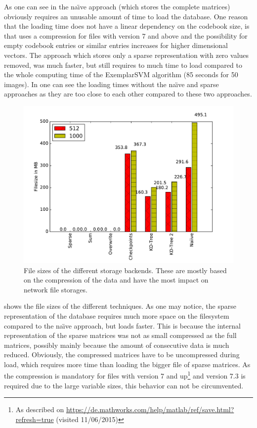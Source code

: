 As one can see in  the na\"{\i}ve approach (which stores the complete matrices) obviously requires an unusable amount of time to load the database. One reason that the loading time does not have a linear dependency on the codebook size, is that \MATLAB uses a compression for files with version 7 and above and the possibility for empty codebook entries or similar entries increases for higher dimensional vectors. The approach which stores only a sparse representation with zero values removed, was much faster, but still requires to much time to load compared to the whole computing time of the ExemplarSVM algorithm (85 seconds for 50 images). In  one can see the loading times without the na\"{\i}ve and sparse approaches as they are too close to each other compared to these two approaches.


\begin{figure}
\centering
\includegraphics[width=0.7\linewidth]{images/file_size}
\caption[File sizes of the different storage backends]{File sizes of the different storage backends. These are mostly based on the compression of the data and have the most impact on network file storages.}
\label{fig:file_sizes}
\end{figure}

 shows the file sizes of the different techniques. As one may notice, the \MATLAB sparse representation of the database requires much more space on the filesystem compared to the na\"{\i}ve approach, but loads faster. This is because the internal representation of the sparse matrices was not as small compressed as the full matrices, possibly mainly because the amount of consecutive data is much reduced. Obviously, the compressed matrices have to be uncompressed during load, which requires more time than loading the bigger file of sparse matrices. As the compression is mandatory for \MATLAB files with version 7 and up\footnote{\label{footnote:matlab_files}As described on \url{https://de.mathworks.com/help/matlab/ref/save.html?refresh=true} (visited 11/06/2015)} and version 7.3 is required due to the large variable sizes, this behavior can not be circumvented.

